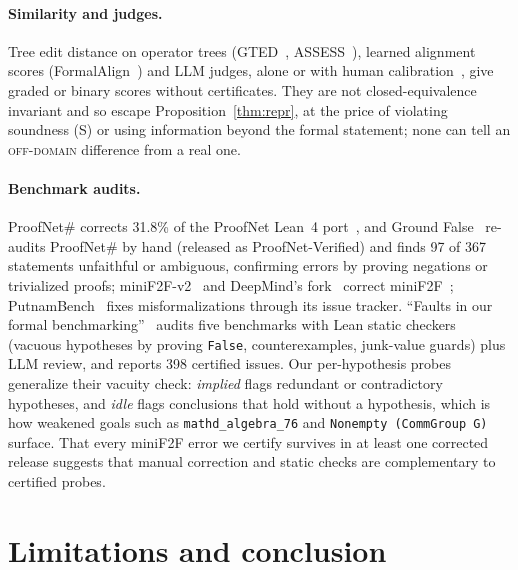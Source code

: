 \documentclass[10pt]{article}
\theoremstyle{definition}
\newcommand{\V}[1]{\textsc{#1}}
\begin{document}
\paragraph{Similarity and judges.} Tree edit distance on operator trees (GTED~\cite{gted},
ASSESS~\cite{assess}), learned alignment scores (FormalAlign~\cite{formalalign}) and LLM judges,
alone or with human calibration~\cite{beyondcomp,atf}, give graded or binary scores without
certificates. They are not closed-equivalence invariant and so escape Proposition~\ref{thm:repr}, at
the price of violating soundness (S) or using information beyond the formal statement; none can
tell an \V{off-domain} difference from a real one.

\paragraph{Benchmark audits.} ProofNet\# corrects 31.8\% of the ProofNet Lean~4
port~\cite{beq,proofnet}, and Ground False~\cite{pnv} re-audits ProofNet\# by hand (released as
ProofNet-Verified) and finds 97 of 367 statements unfaithful or ambiguous, confirming errors by proving negations or
trivialized proofs; miniF2F-v2~\cite{minif2fv2} and DeepMind's fork~\cite{minif2fdm} correct
miniF2F~\cite{minif2f}; PutnamBench~\cite{putnambench} fixes misformalizations through its issue
tracker. ``Faults in our formal benchmarking''~\cite{faults} audits five benchmarks with Lean
static checkers (vacuous hypotheses by proving \texttt{False}, counterexamples, junk-value guards)
plus LLM review, and reports 398 certified issues. Our per-hypothesis probes generalize their
vacuity check: \emph{implied} flags redundant or contradictory hypotheses, and \emph{idle} flags
conclusions that hold without a hypothesis, which is how weakened goals such as
\texttt{mathd\_algebra\_76} and \texttt{Nonempty (CommGroup G)} surface. That every miniF2F error we
certify survives in at least one corrected release suggests that manual correction and static
checks are complementary to certified probes.

\section{Limitations and conclusion}\label{sec:conclusion}
\end{document}
